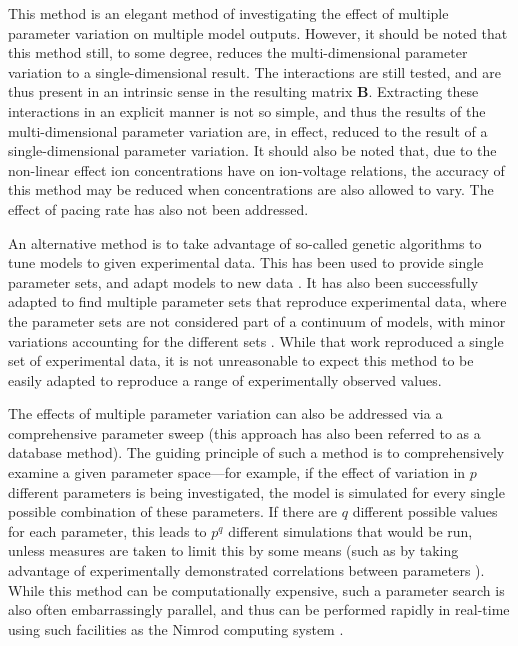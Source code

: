 \documentclass[../thesis-main.tex]{subfiles}
\begin{document}
 This method is an elegant method of investigating the effect of multiple parameter variation on multiple model outputs. However, it should be noted that this method still, to some degree, reduces the multi-dimensional parameter variation to a single-dimensional result. The interactions are still tested, and are thus present in an intrinsic sense in the resulting matrix $\mathbf{B}$. Extracting these interactions in an explicit manner is not so simple, and thus the results of the multi-dimensional parameter variation are, in effect, reduced to the result of a single-dimensional parameter variation. It should also be noted that, due to the non-linear effect ion concentrations have on ion-voltage relations, the accuracy of this method may be reduced when concentrations are also allowed to vary. The effect of pacing rate has also not been addressed.
 
 An alternative method is to take advantage of so-called genetic algorithms to tune models to given experimental data. This has been used to provide single parameter sets, and adapt models to new data \citep{Kherlopian2011}. It has also been successfully adapted to find multiple parameter sets that reproduce experimental data, where the parameter sets are not considered part of a continuum of models, with minor variations accounting for the different sets \citep{Achard2006, Syed2005}. While that work reproduced a single set of experimental data, it is not unreasonable to expect this method to be easily adapted to reproduce a range of experimentally observed values.
 
 The effects of multiple parameter variation can also be addressed via a comprehensive parameter sweep (this approach has also been referred to as a database method). The guiding principle of such a method is to comprehensively examine a given parameter space---for example, if the effect of variation in $p$ different parameters is being investigated, the model is simulated for every single possible combination of these parameters. If there are $q$ different possible values for each parameter, this leads to $p^q$ different simulations that would be run, unless measures are taken to limit this by some means (such as by taking advantage of experimentally demonstrated correlations between parameters \citep{Schulz2006}). While this method can be computationally expensive, such a parameter search is also often embarrassingly parallel, and thus can be performed rapidly in real-time using such facilities as the Nimrod computing system \citep{Abramson2000, Abramson1997, Abramson2009, Abramson2010}.
 
\end{document}

